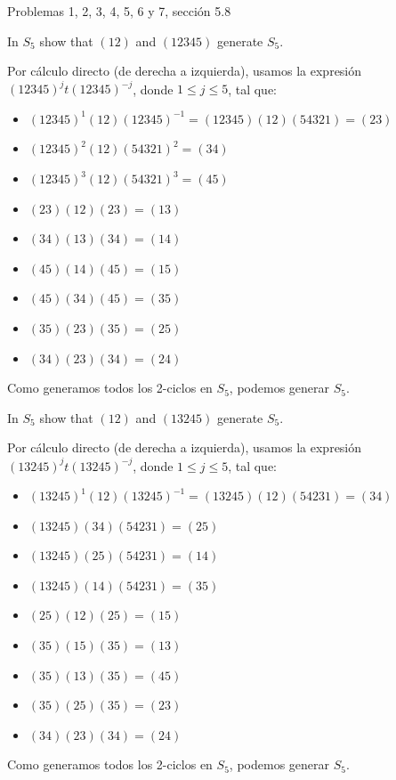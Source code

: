 





Problemas 1, 2, 3, 4, 5, 6 y 7, sección 5.8


\begin{problema}[Problema 1]
    In $S_5$ show that $(1 2)$ and $(1 2 3 4 5)$ generate $S_5$.
    \begin{dem}
       Por cálculo directo (de derecha a izquierda), usamos la expresión $(1 2 3 4 5)^{j}t(1 2 3 4 5)^{-j}$, donde $1\leq j\leq 5$, tal que:

       \begin{itemize}
        \item $(1 2 3 4 5)^{1}(1 2)(1 2 3 4 5)^{-1} = (1 2 3 4 5)(1 2)(54321)=(23) $
        \item $(1 2 3 4 5)^2(1 2)(54321)^2=(34) $
        \item $(1 2 3 4 5)^3(1 2)(54321)^3=(45) $
        \item $(23)(1 2)(23)=(13) $
        \item $(34)(13)(34)= (14)$
        \item $(45)(14)(45)= (15)$
        \item $(45)(34)(45)= (35)$
        \item $(35)(23)(35)= (25)$
        \item $(34)(23)(34)= (24)$
       \end{itemize}
       Como generamos todos los 2-ciclos en $S_5$, podemos generar $S_5$.
    \end{dem}

\end{problema}

\begin{problema}[Problema 2]
    In $S_5$ show that $(1 2)$ and $(13245)$ generate $S_5$.
    \begin{dem}
        Por cálculo directo (de derecha a izquierda), usamos la expresión $(13245)^{j}t(13245)^{-j}$, donde $1\leq j\leq 5$, tal que:
 
        \begin{itemize}
         \item $(13245)^{1}(1 2)(13245)^{-1} = (13245)(1 2)(54231)=(34)$
         \item $(13245)(34)(54231)=(25)$
         \item $(13245)(25)(54231)=(14)$
         \item $(13245)(14)(54231)=(35)$
         \item $(25)(12)(25)=(15)$
         \item $(35)(15)(35)=(13)$
         \item $(35)(13)(35)=(45)$
         \item $(35)(25)(35)=(23)$
         \item $(34)(23)(34)=(24)$
        \end{itemize}
        Como generamos todos los 2-ciclos en $S_5$, podemos generar $S_5$.
     \end{dem}
 
\end{problema}



